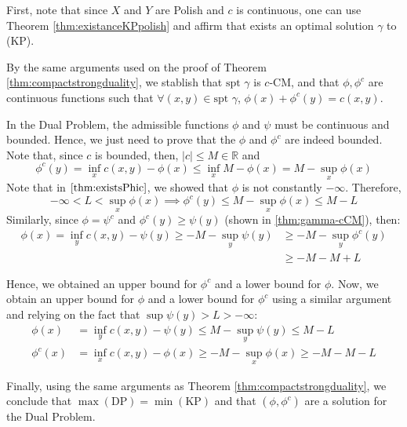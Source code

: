 \begin{prf}
  First, note that since $X$ and $Y$ are Polish and $c$ is continuous,
  one can use Theorem \ref{thm:existanceKPpolish} and affirm that exists an optimal solution
  $\gamma$ to (KP).

  By the same arguments used on the proof of Theorem \ref{thm:compactstrongduality},
  we stablish that $\text{spt } \gamma$ is $c$-CM, and that $\phi, \phi^c$ are continuous functions
  such that $\forall (x,y) \in \text{spt } \gamma$, $\phi(x) + \phi^c(y) = c(x,y)$.

  In the Dual Problem, the admissible functions $\phi$ and $\psi$ must be continuous and bounded. Hence,
  we just need to prove that the $\phi$ and $\phi^c$ are indeed bounded. Note that, since $c$ is bounded,
  then, $|c| \leq M \in \mathbb R$ and
  \begin{equation*}
    \phi^c(y) = \inf_x c(x,y) - \phi(x) \leq  \inf_x M - \phi(x) =
    M - \sup_x \phi(x)
  \end{equation*}
  Note that in $\ref{thm:existsPhic}$, we showed that $\phi$ is not constantly $-\infty$. Therefore,
  \begin{equation*}
    -\infty < L < \sup_x \phi(x) \implies
    \phi^c(y) \leq M - \sup_x \phi(x) \leq M - L
  \end{equation*}
  Similarly, since $\phi = \psi^c$ and $\phi^c(y)\geq \psi(y)$ (shown in \ref{thm:gamma-cCM}), then:
  \begin{align*}
    \phi(x) = \inf_y c(x,y) - \psi(y) \geq - M - \sup_y \psi(y) & \geq - M - \sup_y \phi^c(y) \\
                                                                & \geq -M - M + L
  \end{align*}

  Hence, we obtained an upper bound for $\phi^c$ and a lower bound for $\phi$. Now, we obtain an upper bound
  for $\phi$ and a lower bound for $\phi^c$ using a similar argument and relying on the fact that
  $\sup \psi(y) > L > -\infty$:
  \begin{align*}
    \phi(x)  & = \inf_y c(x,y) - \psi(y) \leq M - \sup_y \psi(y) \leq M - L        \\
    \phi^c(x) & = \inf_x c(x,y) - \phi(x) \geq - M - \sup_x \phi(x) \geq -M - M - L
  \end{align*}

  Finally, using the same arguments as Theorem \ref{thm:compactstrongduality}, we conclude that
  $\mathrm{\max (DP)} = \mathrm{\min (KP)}$ and that $(\phi,\phi^c)$ are a solution for the Dual Problem.
\end{prf}

